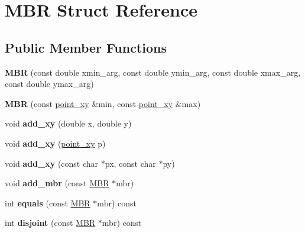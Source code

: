 \hypertarget{structMBR}{}\section{M\+BR Struct Reference}
\label{structMBR}
\subsection*{Public Member Functions}
\begin{DoxyCompactItemize}
\item 
\mbox{\label{structMBR_a2fa23e1956ecda01a938ea6b572fbae4}} 
{\bfseries M\+BR} (const double xmin\+\_\+arg, const double ymin\+\_\+arg, const double xmax\+\_\+arg, const double ymax\+\_\+arg)
\item 
\mbox{\label{structMBR_a31a54538ef665c43a559e9a9028ccf32}} 
{\bfseries M\+BR} (const \mbox{\hyperlink{classpoint__xy}{point\+\_\+xy}} \&min, const \mbox{\hyperlink{classpoint__xy}{point\+\_\+xy}} \&max)
\item 
\mbox{\label{structMBR_a5eba1f9d08be8eb2bae67f120ddf553c}} 
void {\bfseries add\+\_\+xy} (double x, double y)
\item 
\mbox{\label{structMBR_a5650eeecff5499b7264fc982fca17ca8}} 
void {\bfseries add\+\_\+xy} (\mbox{\hyperlink{classpoint__xy}{point\+\_\+xy}} p)
\item 
\mbox{\label{structMBR_a61ebed1f53646eeb67e01b6d0d0d5e91}} 
void {\bfseries add\+\_\+xy} (const char $\ast$px, const char $\ast$py)
\item 
\mbox{\label{structMBR_af2e5278b6d18fb3503ac3475d0aa430f}} 
void {\bfseries add\+\_\+mbr} (const \mbox{\hyperlink{structMBR}{M\+BR}} $\ast$mbr)
\item 
\mbox{\label{structMBR_a1702f5f8e8a2130f333f1cc2012cc50f}} 
int {\bfseries equals} (const \mbox{\hyperlink{structMBR}{M\+BR}} $\ast$mbr) const
\item 
\mbox{\label{structMBR_af6f7556098fd6b508d4836d3191c508a}} 
int {\bfseries disjoint} (const \mbox{\hyperlink{structMBR}{M\+BR}} $\ast$mbr) const
\item 

\end{DoxyCompactItemize}
